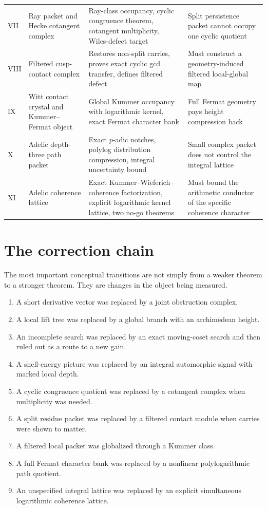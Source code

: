 {\begin{longtable}{C{0.060\textwidth}L{0.195\textwidth}L{0.285\textwidth}L{0.245\textwidth}}
VII & Ray packet and Hecke cotangent complex & Ray-class occupancy, cyclic congruence theorem, cotangent multiplicity, Wiles-defect target & Split persistence packet cannot occupy one cyclic quotient\\
VIII & Filtered cusp-contact complex & Restores non-split carries, proves exact cyclic gcd transfer, defines filtered defect & Must construct a geometry-induced filtered local-global map\\
IX & Witt contact crystal and Kummer--Fermat object & Global Kummer occupancy with logarithmic kernel, exact Fermat character bank & Full Fermat geometry pays height compression back\\
X & Adelic depth-three path packet & Exact $p$-adic notches, polylog distribution compression, integral uncertainty bound & Small complex packet does not control the integral lattice\\
XI & Adelic coherence lattice & Exact Kummer--Wieferich--coherence factorization, explicit logarithmic kernel lattice, two no-go theorems & Must bound the arithmetic conductor of the specific coherence character\\
\bottomrule
\end{longtable}
}

\section{The correction chain}
The most important conceptual transitions are not simply from a weaker theorem to a stronger theorem. They are changes in the object being measured.

\begin{enumerate}[leftmargin=1.5em]
\item A short derivative vector was replaced by a joint obstruction complex.
\item A local lift tree was replaced by a global branch with an archimedean height.
\item An incomplete search was replaced by an exact moving-coset search and then ruled out as a route to a new gain.
\item A shell-energy picture was replaced by an integral automorphic signal with marked local depth.
\item A cyclic congruence quotient was replaced by a cotangent complex when multiplicity was needed.
\item A split residue packet was replaced by a filtered contact module when carries were shown to matter.
\item A filtered local packet was globalized through a Kummer class.
\item A full Fermat character bank was replaced by a nonlinear polylogarithmic path quotient.
\item An unspecified integral lattice was replaced by an explicit simultaneous logarithmic coherence lattice.
\end{enumerate}

